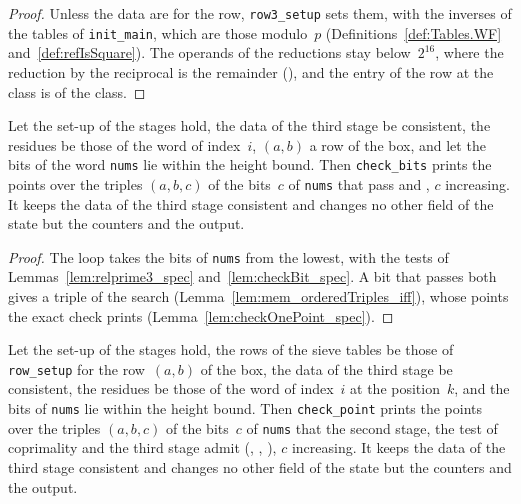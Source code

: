 \begin{proof}
  \leanok
  Unless the data are for the row, \texttt{row3\_setup} sets them, with the inverses of the tables
  of \texttt{init\_main}, which are those modulo~$p$ (Definitions~\ref{def:Tables.WF}
  and~\ref{def:refIsSquare}). The operands of the reductions stay below~$2^{16}$, where the
  reduction by the reciprocal is the remainder (), and the entry of the row
  at the class is  of the class.
\end{proof}

\begin{lemma}\label{lem:checkBits_spec}
  \leanok
  Let the set-up of the stages hold, the data of the third stage be consistent, the residues be
  those of the word of index~$i$, $(a, b)$ a row of the box, and let the bits of the word
  \texttt{nums} lie within the height bound. Then \texttt{check\_bits} prints the points over the
  triples $(a, b, c)$ of the bits~$c$ of \texttt{nums} that pass  and
  , $c$ increasing. It keeps the data of the third stage consistent and
  changes no other field of the state but the counters and the output.
\end{lemma}

\begin{proof}
  \leanok
  The loop takes the bits of \texttt{nums} from the lowest, with the tests of
  Lemmas~\ref{lem:relprime3_spec} and~\ref{lem:checkBit_spec}. A bit that passes both gives a
  triple of the search (Lemma~\ref{lem:mem_orderedTriples_iff}), whose points the exact check
  prints (Lemma~\ref{lem:checkOnePoint_spec}).
\end{proof}

\begin{lemma}\label{lem:checkPoint_spec}
  \leanok
  Let the set-up of the stages hold, the rows of the sieve tables be those of \texttt{row\_setup}
  for the row~$(a, b)$ of the box, the data of the third stage be consistent, the residues be
  those of the word of index~$i$ at the position~$k$, and the bits of \texttt{nums} lie within the
  height bound. Then \texttt{check\_point} prints the points over the triples $(a, b, c)$ of the
  bits~$c$ of \texttt{nums} that the second stage, the test of coprimality and the third stage
  admit (, , ),
  $c$ increasing. It keeps the data of the third stage consistent and changes no other field of the
  state but the counters and the output.
\end{lemma}

